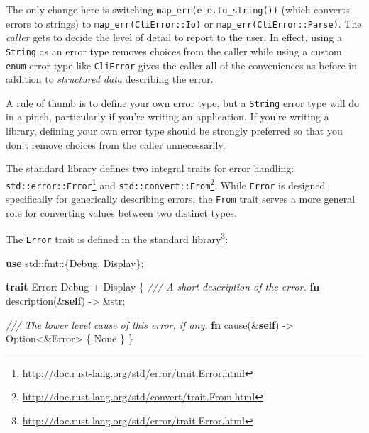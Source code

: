 \documentclass[a4paper,]{book}
\newenvironment{Shaded}{\begin{snugshade}}{\end{snugshade}}
\newcommand{\KeywordTok}[1]{\textcolor[rgb]{0.13,0.29,0.53}{\textbf{{#1}}}}
\newcommand{\DataTypeTok}[1]{\textcolor[rgb]{0.13,0.29,0.53}{{#1}}}
\newcommand{\ConstantTok}[1]{\textcolor[rgb]{0.00,0.00,0.00}{{#1}}}
\newcommand{\CommentTok}[1]{\textcolor[rgb]{0.56,0.35,0.01}{\textit{{#1}}}}
\newcommand{\BuiltInTok}[1]{{#1}}
\newcommand{\NormalTok}[1]{{#1}}
\renewcommand{\href}[2]{#2\footnote{\url{#1}}}
\begin{document}
The only change here is switching
\texttt{map\_err(\textbar{}e\textbar{}\ e.to\_string())} (which converts
errors to strings) to \texttt{map\_err(CliError::Io)} or
\texttt{map\_err(CliError::Parse)}. The \emph{caller} gets to decide the
level of detail to report to the user. In effect, using a
\texttt{String} as an error type removes choices from the caller while
using a custom \texttt{enum} error type like \texttt{CliError} gives the
caller all of the conveniences as before in addition to \emph{structured
data} describing the error.

A rule of thumb is to define your own error type, but a \texttt{String}
error type will do in a pinch, particularly if you're writing an
application. If you're writing a library, defining your own error type
should be strongly preferred so that you don't remove choices from the
caller unnecessarily.


The standard library defines two integral traits for error handling:
\href{http://doc.rust-lang.org/std/error/trait.Error.html}{\texttt{std::error::Error}}
and
\href{http://doc.rust-lang.org/std/convert/trait.From.html}{\texttt{std::convert::From}}.
While \texttt{Error} is designed specifically for generically describing
errors, the \texttt{From} trait serves a more general role for
converting values between two distinct types.


The \texttt{Error} trait is
\href{http://doc.rust-lang.org/std/error/trait.Error.html}{defined in
the standard library}:

\begin{Shaded}
\begin{Highlighting}[]
\KeywordTok{use} \NormalTok{std::fmt::\{}\BuiltInTok{Debug}\NormalTok{, }\BuiltInTok{Display}\NormalTok{\};}

\KeywordTok{trait} \NormalTok{Error: }\BuiltInTok{Debug} \NormalTok{+ }\BuiltInTok{Display} \NormalTok{\{}
  \CommentTok{/// A short description of the error.}
  \KeywordTok{fn} \NormalTok{description(&}\KeywordTok{self}\NormalTok{) -> &}\DataTypeTok{str}\NormalTok{;}

  \CommentTok{/// The lower level cause of this error, if any.}
  \KeywordTok{fn} \NormalTok{cause(&}\KeywordTok{self}\NormalTok{) -> }\DataTypeTok{Option}\NormalTok{<&Error> \{ }\ConstantTok{None} \NormalTok{\}}
\NormalTok{\}}
\end{Highlighting}
\end{Shaded}
\end{document}
